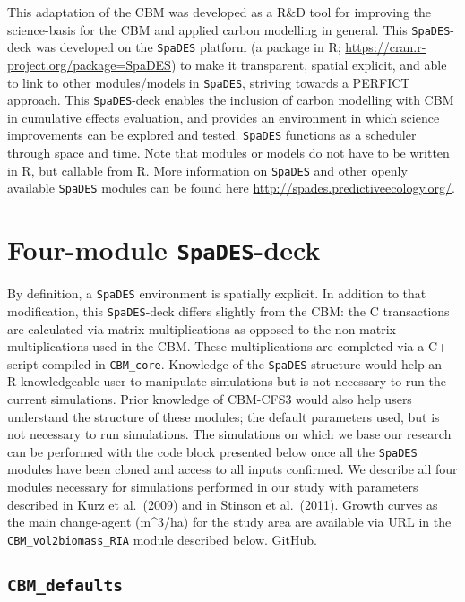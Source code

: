 \documentclass[
]{article}
\begin{document}
This adaptation of the CBM was developed as a R\&D tool for improving
the science-basis for the CBM and applied carbon modelling in general.
This \texttt{SpaDES}-deck was developed on the \texttt{SpaDES} platform
(a package in R; \url{https://cran.r-project.org/package=SpaDES}) to
make it transparent, spatial explicit, and able to link to other
modules/models in \texttt{SpaDES}, striving towards a PERFICT approach.
This \texttt{SpaDES}-deck enables the inclusion of carbon modelling with
CBM in cumulative effects evaluation, and provides an environment in
which science improvements can be explored and tested. \texttt{SpaDES}
functions as a scheduler through space and time. Note that modules or
models do not have to be written in R, but callable from R. More
information on \texttt{SpaDES} and other openly available
\texttt{SpaDES} modules can be found here
\url{http://spades.predictiveecology.org/}.

\hypertarget{four-module-spades-deck}{%
\section{\texorpdfstring{Four-module
\texttt{SpaDES}-deck}{Four-module SpaDES-deck}}\label{four-module-spades-deck}}

By definition, a \texttt{SpaDES} environment is spatially explicit. In
addition to that modification, this \texttt{SpaDES}-deck differs
slightly from the CBM: the C transactions are calculated via matrix
multiplications as opposed to the non-matrix multiplications used in the
CBM. These multiplications are completed via a C++ script compiled in
\texttt{CBM\_core}. Knowledge of the \texttt{SpaDES} structure would
help an R-knowledgeable user to manipulate simulations but is not
necessary to run the current simulations. Prior knowledge of CBM-CFS3
would also help users understand the structure of these modules; the
default parameters used, but is not necessary to run simulations. The
simulations on which we base our research can be performed with the code
block presented below once all the \texttt{SpaDES} modules have been
cloned and access to all inputs confirmed. We describe all four modules
necessary for simulations performed in our study with parameters
described in Kurz et al.~(2009) and in Stinson et al.~(2011). Growth
curves as the main change-agent (m\^{}3/ha) for the study area are
available via URL in the \texttt{CBM\_vol2biomass\_RIA} module described
below. GitHub.

\hypertarget{cbm_defaults}{%
\subsection{\texorpdfstring{\texttt{CBM\_defaults}}{CBM\_defaults}}\label{cbm_defaults}}
\end{document}

